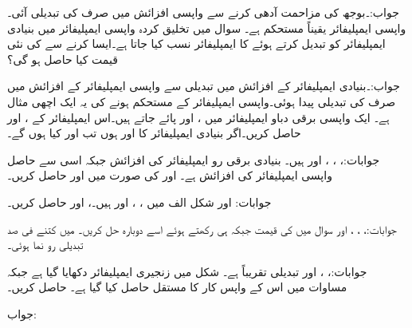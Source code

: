 جواب:۔بوجھ کی مزاحمت آدھی کرنے سے واپسی افزائش میں صرف  کی تبدیلی آئی۔واپسی ایمپلیفائر یقیناً مستحکم ہے۔
سوال  میں تخلیق کردہ واپسی ایمپلیفائر میں بنیادی ایمپلیفائر کو تبدیل کرتے ہوئے  کا ایمپلیفائر  نسب کیا جاتا ہے۔ایسا کرنے سے  کی نئی قیمت کیا حاصل ہو گی؟

جواب:۔بنیادی ایمپلیفائر کے افزائش میں  تبدیلی سے واپسی ایمپلیفائر کے افزائش میں صرف  کی تبدیلی پیدا ہوئی۔واپسی ایمپلیفائر کے مستحکم ہونے کی یہ ایک اچھی مثال ہے۔
ایک واپسی برقی دباو ایمپلیفائر میں ،  اور  پائے جاتے ہیں۔اس ایمپلیفائر کے ،  اور  حاصل کریں۔اگر بنیادی ایمپلیفائر کا  اور  ہوں تب  اور  کیا ہوں گے۔

جوابات:، ، ،  اور  ہیں۔
بنیادی برقی رو ایمپلیفائر کی افزائش  جبکہ اسی سے حاصل واپسی ایمپلیفائر کی افزائش  ہے۔ اور  کی صورت میں  اور  حاصل کریں۔

جوابات: اور 
شکل  الف میں ، ،  اور  ہیں۔،  اور  حاصل کریں۔

جوابات:، ، ،  اور 
سوال  میں  کی قیمت  جبکہ  ہی رکھتے ہوئے اسے دوبارہ حل کریں۔ میں کتنے فی صد تبدیلی رو نما ہوئی۔

جوابات:، ،  اور تبدیلی تقریباً   ہے۔
شکل  میں زنجیری ایمپلیفائر دکھایا گیا ہے جبکہ مساوات  میں اس کے واپس کار کا مستقل  حاصل کیا گیا ہے۔ حاصل کریں۔

جواب: 

